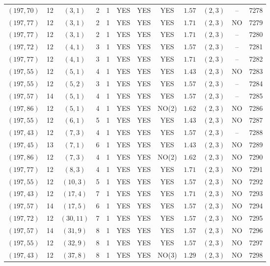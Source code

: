 \begin{longtable}{|c|c|c|c|c|c|c|c|c|c|c|c|}
$(197,70)$ & 12 & $(3,1)$ & 2 & 1 & YES & YES & YES & $1.57$ & $(2,3)$ & -- & 7278\\
$(197,77)$ & 12 & $(3,1)$ & 2 & 1 & YES & YES & YES & $1.71$ & $(2,3)$ & NO & 7279\\
$(197,77)$ & 12 & $(3,1)$ & 2 & 1 & YES & YES & YES & $1.71$ & $(2,3)$ & -- & 7280\\
$(197,72)$ & 12 & $(4,1)$ & 3 & 1 & YES & YES & YES & $1.57$ & $(2,3)$ & -- & 7281\\
$(197,77)$ & 12 & $(4,1)$ & 3 & 1 & YES & YES & YES & $1.71$ & $(2,3)$ & -- & 7282\\
$(197,55)$ & 12 & $(5,1)$ & 4 & 1 & YES & YES & YES & $1.43$ & $(2,3)$ & NO & 7283\\
$(197,55)$ & 12 & $(5,2)$ & 3 & 1 & YES & YES & YES & $1.57$ & $(2,3)$ & -- & 7284\\
$(197,57)$ & 14 & $(5,1)$ & 4 & 1 & YES & YES & YES & $1.57$ & $(2,3)$ & -- & 7285\\
$(197,86)$ & 12 & $(5,1)$ & 4 & 1 & YES & YES & NO(2) & $1.62$ & $(2,3)$ & NO & 7286\\
$(197,55)$ & 12 & $(6,1)$ & 5 & 1 & YES & YES & YES & $1.43$ & $(2,3)$ & NO & 7287\\
$(197,43)$ & 12 & $(7,3)$ & 4 & 1 & YES & YES & YES & $1.57$ & $(2,3)$ & -- & 7288\\
$(197,45)$ & 13 & $(7,1)$ & 6 & 1 & YES & YES & YES & $1.43$ & $(2,3)$ & NO & 7289\\
$(197,86)$ & 12 & $(7,3)$ & 4 & 1 & YES & YES & NO(2) & $1.62$ & $(2,3)$ & NO & 7290\\
$(197,77)$ & 12 & $(8,3)$ & 4 & 1 & YES & YES & YES & $1.71$ & $(2,3)$ & NO & 7291\\
$(197,55)$ & 12 & $(10,3)$ & 5 & 1 & YES & YES & YES & $1.57$ & $(2,3)$ & NO & 7292\\
$(197,43)$ & 12 & $(17,4)$ & 7 & 1 & YES & YES & YES & $1.71$ & $(2,3)$ & NO & 7293\\
$(197,57)$ & 14 & $(17,5)$ & 6 & 1 & YES & YES & YES & $1.57$ & $(2,3)$ & NO & 7294\\
$(197,72)$ & 12 & $(30,11)$ & 7 & 1 & YES & YES & YES & $1.57$ & $(2,3)$ & NO & 7295\\
$(197,57)$ & 14 & $(31,9)$ & 8 & 1 & YES & YES & YES & $1.57$ & $(2,3)$ & NO & 7296\\
$(197,55)$ & 12 & $(32,9)$ & 8 & 1 & YES & YES & YES & $1.57$ & $(2,3)$ & NO & 7297\\
$(197,43)$ & 12 & $(37,8)$ & 8 & 1 & YES & YES & NO(3) & $1.29$ & $(2,3)$ & NO & 7298\\

\end{longtable}
